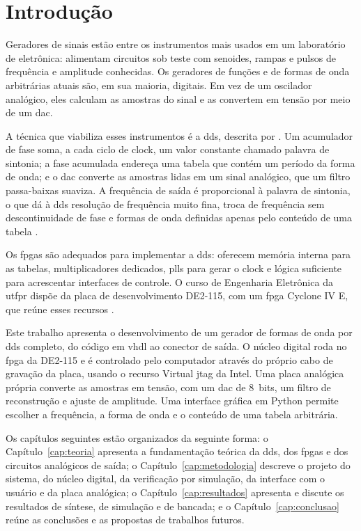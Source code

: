 \chapter{Introdução}

Geradores de sinais estão entre os instrumentos mais usados em um laboratório de eletrônica: alimentam circuitos sob teste com senoides, rampas e pulsos de frequência e amplitude conhecidas. Os geradores de funções e de formas de onda arbitrárias atuais são, em sua maioria, digitais. Em vez de um oscilador analógico, eles calculam as amostras do sinal e as convertem em tensão por meio de um \ac{dac}.

A técnica que viabiliza esses instrumentos é a \ac{dds}, descrita por \textcite{tierney1971}. Um acumulador de fase soma, a cada ciclo de clock, um valor constante chamado palavra de sintonia; a fase acumulada endereça uma tabela que contém um período da forma de onda; e o \ac{dac} converte as amostras lidas em um sinal analógico, que um filtro passa-baixas suaviza. A frequência de saída é proporcional à palavra de sintonia, o que dá à \ac{dds} resolução de frequência muito fina, troca de frequência sem descontinuidade de fase e formas de onda definidas apenas pelo conteúdo de uma tabela \cites{ad1999,kester2008}.

Os \acp{fpga} são adequados para implementar a \ac{dds}: oferecem memória interna para as tabelas, multiplicadores dedicados, \acp{pll} para gerar o clock e lógica suficiente para acrescentar interfaces de controle. O curso de Engenharia Eletrônica da \ac{utfpr} dispõe da placa de desenvolvimento DE2-115, com um \ac{fpga} Cyclone IV E, que reúne esses recursos \cite{terasic2010}.

Este trabalho apresenta o desenvolvimento de um gerador de formas de onda por \ac{dds} completo, do código em \ac{vhdl} ao conector de saída. O núcleo digital roda no \ac{fpga} da DE2-115 e é controlado pelo computador através do próprio cabo de gravação da placa, usando o recurso Virtual \ac{jtag} da Intel. Uma placa analógica própria converte as amostras em tensão, com um \ac{dac} de 8~bits, um filtro de reconstrução e ajuste de amplitude. Uma interface gráfica em Python permite escolher a frequência, a forma de onda e o conteúdo de uma tabela arbitrária.

Os capítulos seguintes estão organizados da seguinte forma: o Capítulo~\ref{cap:teoria} apresenta a fundamentação teórica da \ac{dds}, dos \acp{fpga} e dos circuitos analógicos de saída; o Capítulo~\ref{cap:metodologia} descreve o projeto do sistema, do núcleo digital, da verificação por simulação, da interface com o usuário e da placa analógica; o Capítulo~\ref{cap:resultados} apresenta e discute os resultados de síntese, de simulação e de bancada; e o Capítulo~\ref{cap:conclusao} reúne as conclusões e as propostas de trabalhos futuros.

